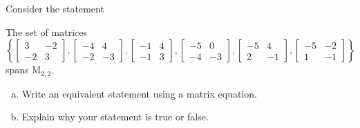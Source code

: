 
\begin{exerciseStatement}


Consider the statement 
\begin{center}\begin{minipage}{0.8\textwidth}
 The set of matrices \( \left\{ \left[\begin{array}{cc}
3 & -2 \\
-2 & 3
\end{array}\right] , \left[\begin{array}{cc}
-4 & 4 \\
-2 & -3
\end{array}\right] , \left[\begin{array}{cc}
-1 & 4 \\
-1 & 3
\end{array}\right] , \left[\begin{array}{cc}
-5 & 0 \\
-4 & -3
\end{array}\right] , \left[\begin{array}{cc}
-5 & 4 \\
2 & -1
\end{array}\right] , \left[\begin{array}{cc}
-5 & -2 \\
1 & -1
\end{array}\right] \right\} \) spans \(\mathrm{M}_{2,2}\). 
\end{minipage}\end{center}
    


\begin{enumerate}[(a)]
\item  Write an equivalent statement using a matrix equation.
\item  Explain why your statement is true or false.
\end{enumerate}
    
\end{exerciseStatement}
    

